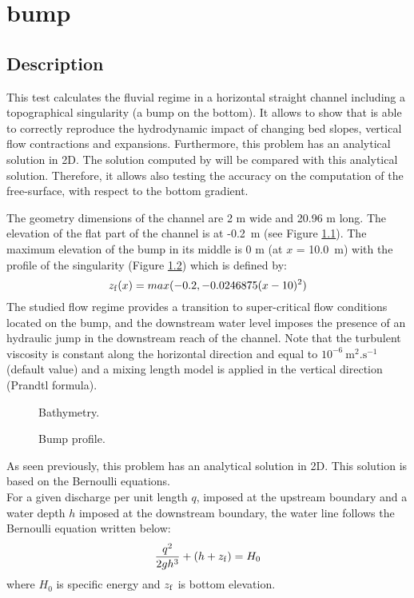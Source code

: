 \chapter{bump}
%
\section{Description}
\bigskip
This test calculates the fluvial regime in a horizontal straight channel
including a topographical singularity (a bump on the bottom). 
It allows to show that  is able to correctly reproduce the hydrodynamic 
impact of changing bed slopes, vertical flow contractions and expansions.
Furthermore, this problem has an analytical solution in 2D. 
The solution computed by  will be compared with this analytical 
solution. Therefore, it allows also testing the accuracy on the computation of the
free-surface, with respect to the bottom gradient. 

\bigskip
The geometry dimensions of the channel are 2 m wide and 20.96 m long. 
The elevation of the flat part of the channel is at -0.2~m 
(see Figure \ref{t3d:bump:fig:bathy}).
The maximum elevation of the bump in its middle is 0 m (at $x$ = 10.0~m) 
with the profile of the singularity (Figure \ref{t3d:bump:fig:profil}) 
which is defined by:
\begin{equation*}
z_{\rm{f}}(x) =max(-0.2, -0.0246875(x-10)^2)
\end{equation*}
The studied flow regime provides a transition to super-critical flow conditions 
located on the bump,
and the downstream water level imposes the presence of an hydraulic jump 
in the downstream reach of the channel.
Note that the turbulent viscosity is constant along the horizontal direction
and equal to $10^{-6}~\text{m}^2.\text{s}^{-1}$ (default value) and a mixing
length model is applied in the vertical direction (Prandtl formula).

\begin{figure}[!htbp]
 \centering
 \caption{Bathymetry.}
 \label{t3d:bump:fig:bathy}
\end{figure}
\begin{figure}[!htbp]
 \centering
 \caption{Bump profile.}
 \label{t3d:bump:fig:profil}
\end{figure}

\bigskip
As seen previously, this problem has an analytical solution in 2D. 
This solution is based on the Bernoulli equations.\\
For a given discharge per unit length $q$, imposed at the upstream
boundary and a water depth $h$ imposed at the downstream boundary,
the water line follows the Bernoulli equation written below:
\begin{equation*}
\frac{q^2}{2gh^3}+ (h + z_{\rm{f}}) = H_0
\end{equation*}
where $H_0$ is specific energy and $z_{\rm{f}}$ is bottom elevation.


